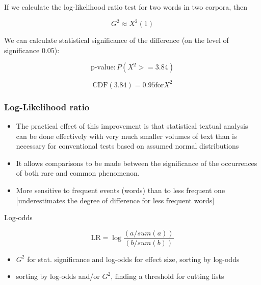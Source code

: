 \documentclass[svgnames]{beamer}
\begin{document}
\begin{frame}
  If we calculate the log-likelihood ratio test for two words in two corpora, then


    $$G^2 \approx X^2(1)$$


      We can calculate statistical significance of the difference (on the level of significance 0.05):

      $$\text{p-value}: P(X^2 >= 3.84)$$

      $$\text{CDF}(3.84) = 0.95 \text{for} X^2$$

\end{frame}

\begin{frame}
  \frametitle{Log-Likelihood ratio}

  \begin{itemize}
    \item The practical effect of this improvement is that  statistical textual analysis can be done
  effectively with very much smaller volumes of text than is necessary for conventional tests based on assumed normal distributions
  \item It allows comparisons to be made between the significance of the occurrences of both rare and common phenomenon.
  \item More sensitive to frequent events (words) than to less frequent one [underestimates the degree of difference for less frequent words]
  \end{itemize}
\end{frame}

\begin{frame}{Log-odds}

  $$\text{LR} = \log\frac{(a/sum(a))}{(b/sum(b))}$$

\end{frame}


\begin{frame}
  \begin{itemize}
    \item $G^2$ for stat. significance and log-odds for effect size, sorting by log-odds
    \item sorting by log-odds and/or $G^2$, finding a threshold for cutting lists
\end{itemize}
\end{frame}


%
%
%
\end{document}
